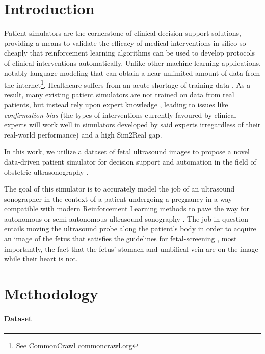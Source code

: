 \section{Introduction}

Patient simulators are the cornerstone of clinical decision support solutions, providing a means to validate the efficacy of medical interventions in silico so cheaply that reinforcement learning algorithms can be used to develop protocols of clinical interventions automatically.
Unlike other machine learning applications, notably language modeling that can obtain a near-unlimited amount of data from the internet\footnote{See CommonCrawl \cite{commoncrawl} \url{commoncrawl.org}}, Healthcare suffers from an acute shortage of training data \cite{datashortage}.
As a result, many existing patient simulators are not trained on data from real patients, but instead rely upon expert knowledge \cite{towards}, leading to issues like \emph{confirmation bias} (the types of interventions currently favoured by clinical experts will work well in simulators developed by said experts irregardless of their real-world performance) and a high Sim2Real \cite{sim2real} gap.

In this work, we utilize a dataset of fetal ultrasound images to propose a novel data-driven patient simulator for decision support and automation in the field of obstetric ultrasonography \cite{obstetrics-sonography}.

The goal of this simulator is to accurately model the job of an ultrasound sonographer in the context of a patient undergoing a pregnancy in a way compatible with modern Reinforcement Learning methods \cite{rl-review}
to pave the way for autonomous or semi-autonomous ultrasound sonography \cite{autonomous-ultrasound-review}.
The job in question entails moving the ultrasound probe along the patient's body in order to acquire an image of the fetus that satisfies the guidelines for fetal-screening \cite{isoug-guidelines}, most importantly, the fact that the fetus' stomach and umbilical vein are on the image while their heart is not.

\newpage
\section{Methodology}

\paragraph{Dataset}

